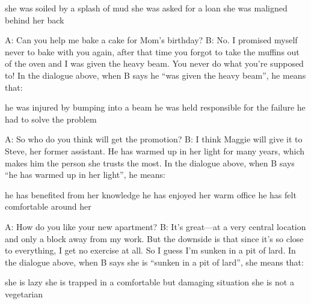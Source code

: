 \documentclass[output=paper]{langsci/langscibook}
\begin{document}
\begin{subappendices}
{\begin{exe}
\begin{xlist}
\begin{xlist}
         she was soiled by a splash of mud
         she was asked for a loan
         she was maligned behind her back
        \end{xlist}
        \end{xlist}
    \newpage
     \begin{xlist}
        \sn A: Can you help me bake a cake for Mom's birthday?
        \sn B: No. I promised myself never to bake with you again, after that time you forgot to take the muffins out of the oven and I was given the heavy beam. You never do what you're supposed to!
        \sn In the dialogue above, when B says he \enquote{was given the heavy beam}, he means that:
        \begin{xlist}
         he was injured by bumping into a beam
         he was held responsible for the failure
         he had to solve the problem
        \end{xlist}
        \end{xlist}
     \begin{xlist}
        \sn A: So who do you think will get the promotion?
        \sn B: I think Maggie will give it to Steve, her former assistant. He has warmed up in her light for many years, which makes him the person she trusts the most.
        \sn In the dialogue above, when B says \enquote{he has warmed up in her light}, he means:
        \begin{xlist}
         he has benefited from her knowledge
         he has enjoyed her warm office
         he has felt comfortable around her
        \end{xlist}
        \end{xlist}
     \begin{xlist}
        \sn A: How do you like your new apartment?
        \sn B: It's great—at a very central location and only a block away from my work. But the downside is that since it's so close to everything, I get no exercise at all. So I guess I’m sunken in a pit of lard.
        \sn In the dialogue above, when B says she is \enquote{sunken in a pit of lard}, she means that:
        \begin{xlist}
         she is lazy
         she is trapped in a comfortable but damaging situation
         she is not a vegetarian
        \end{xlist}
        \end{xlist}
     \begin{xlist}

\end{xlist}
\end{exe}}
\end{subappendices}
\end{document}
